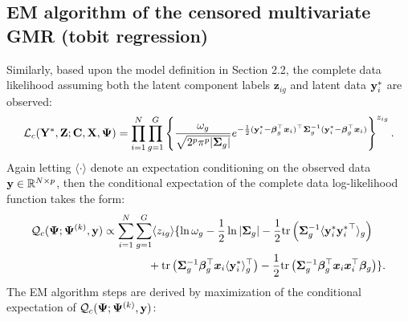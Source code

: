 \documentclass{interact}
\theoremstyle{plain}
\theoremstyle{definition}
\theoremstyle{remark}
\begin{document}
\subsection{EM algorithm of the censored multivariate GMR (tobit regression)}
\label{Supplement:1.2}
Similarly, based upon the model definition in Section 2.2, the complete data likelihood assuming both the latent component labels $\mathbf{z}_{ig}$ and latent data $\mathbf{y}_i^*$ are observed:
\begin{align}
    \mathcal{L}_c(\mathbf{Y}^*, \mathbf{Z} ;\textbf{C},\mathbf{X},\bm{\Psi})=\prod_{i=1}^N\prod_{g=1}^G \left\{ \frac{\omega_g}{\sqrt{2^p\pi^p|\bm{\Sigma}_g|}}e^{-\frac{1}{2}(\mathbf{y}_i^*-{\bm \beta}_g^\top\bm{x}_i)^\top\bm{\Sigma}_g^{-1}(\mathbf{y}_i^*-{\bm \beta}_g^\top\bm{x}_i)}\right\}^{z_{ig}}.
\end{align}
Again letting $\langle \cdot \rangle$ denote an expectation conditioning on the observed data $\mathbf{y} \in \mathbb{R}^{N\times p}$, then the conditional expectation of the complete data log-likelihood function takes the form:
\begin{align}
\begin{split}
    \mathcal{Q}_c(\bm{\Psi};\bm{\Psi}^{(k)},\mathbf{y})
    &\propto \sum_{i=1}^N\sum_{g=1}^G\langle z_{ig}\rangle\{\ln \omega_g-\frac{1}{2}\ln{|\bm{\Sigma}_g|}-\frac{1}{2}\mathrm{tr}\left(\bm{\Sigma}_g^{-1}\langle \mathbf{y}_i^*{\mathbf{y}_i^*}^\top\rangle_g\right)\\
    &\qquad\qquad+\mathrm{tr}\left(\bm{\Sigma}_g^{-1}{\bm \beta}_g^\top\bm{x}_i\langle {\mathbf{y}_i^*}\rangle_g^\top\right)-\frac{1}{2}\mathrm{tr}\left(\bm{\Sigma}_g^{-1}{\bm \beta}_g^\top\bm{x}_i\bm{x}_i^\top{\bm \beta}_g\right)\}.
\end{split}
\end{align}
The EM algorithm steps are derived by maximization of the conditional expectation of $\mathcal{Q}_c(\bm{\Psi};\bm{\Psi}^{(k)},\mathbf{y})$:
\end{document}
